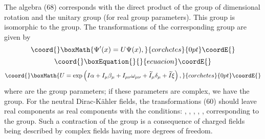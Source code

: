 \documentclass[a4paper,12pt]{article}
\begin{document}
The algebra (68) corresponds with the direct product of the group
of \coordHE{} dimensional rotation \coordHE{} and the unitary group \coordHE{}
(for real group parameters). This group is isomorphic to the
\coordHE{} group. The transformations of the corresponding group are
given by
\[\coord{}\boxMath{
\Psi ^{\prime }(x)=U\Psi (x) ,
}{corchetes}{0pt}\coordE{}\]
\vspace{-8mm}
\begin{equation}\coord{}\boxEquation{  \label{69}
}{  }{ecuacion}\coordE{}\end{equation}
\vspace{-8mm}
\[\coord{}\boxMath{
U=\exp \left( I\alpha +I_\mu \beta _\mu +I_{\mu \nu }\omega _{\mu
\nu }+ \widetilde{I}_\mu \delta _\mu +\widetilde{I}\xi \right) ,
}{corchetes}{0pt}\coordE{}\]
where \myHighlight{$\alpha ,$}\coordHE{}  \myHighlight{$\beta _\mu ,$}\coordHE{}  \myHighlight{$\omega _{\mu \nu },$}\coordHE{}  \myHighlight{$\delta _\mu
,$}\coordHE{}  \myHighlight{$\xi $}\coordHE{} are the group parameters; if these parameters are
complex, we have the \coordHE{} group. For the neutral
Dirac-K\"ahler fields, the transformations (60) should leave real
components as real components with the conditions: \myHighlight{$ \alpha
^{*}=\alpha $}\coordHE{}, \coordHE{}, \coordHE{},
\coordHE{}, \coordHE{}, \coordHE{}  \coordHE{}  \myHighlight{$\xi ^{*}=-\xi $}\coordHE{} corresponding to the \coordHE{}
group. Such a contraction of the \coordHE{} group is a consequence
of charged fields being described by complex fields having more
degrees of freedom.
\end{document}
